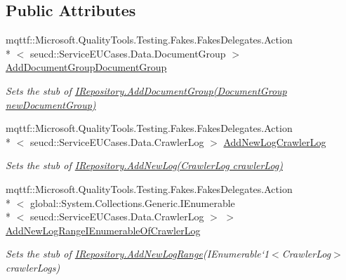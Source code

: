 \subsection*{Public Attributes}
\begin{DoxyCompactItemize}
\item 
mqttf\-::\-Microsoft.\-Quality\-Tools.\-Testing.\-Fakes.\-Fakes\-Delegates.\-Action\\*
$<$ seucd\-::\-Service\-E\-U\-Cases.\-Data.\-Document\-Group $>$ \hyperlink{class_service_e_u_cases_1_1_repositories_1_1_fakes_1_1_stub_i_repository_a313470a687354d7a46077691cb61c662}{Add\-Document\-Group\-Document\-Group}
\begin{DoxyCompactList}\small\item\em Sets the stub of \hyperlink{interface_service_e_u_cases_1_1_repositories_1_1_i_repository_a1dc7e14bffc195cc3fc51df35128064c}{I\-Repository.\-Add\-Document\-Group(\-Document\-Group new\-Document\-Group)}\end{DoxyCompactList}\item 
mqttf\-::\-Microsoft.\-Quality\-Tools.\-Testing.\-Fakes.\-Fakes\-Delegates.\-Action\\*
$<$ seucd\-::\-Service\-E\-U\-Cases.\-Data.\-Crawler\-Log $>$ \hyperlink{class_service_e_u_cases_1_1_repositories_1_1_fakes_1_1_stub_i_repository_a8224a399eea01e43904e7c62c6a4044a}{Add\-New\-Log\-Crawler\-Log}
\begin{DoxyCompactList}\small\item\em Sets the stub of \hyperlink{interface_service_e_u_cases_1_1_repositories_1_1_i_repository_af8b3072d0263cf8cd3e6175577938fa3}{I\-Repository.\-Add\-New\-Log(\-Crawler\-Log crawler\-Log)}\end{DoxyCompactList}\item 
mqttf\-::\-Microsoft.\-Quality\-Tools.\-Testing.\-Fakes.\-Fakes\-Delegates.\-Action\\*
$<$ global\-::\-System.\-Collections.\-Generic.\-I\-Enumerable\\*
$<$ seucd\-::\-Service\-E\-U\-Cases.\-Data.\-Crawler\-Log $>$ $>$ \hyperlink{class_service_e_u_cases_1_1_repositories_1_1_fakes_1_1_stub_i_repository_ad1353a1205f37f0aa6a6844ffd373580}{Add\-New\-Log\-Range\-I\-Enumerable\-Of\-Crawler\-Log}
\begin{DoxyCompactList}\small\item\em Sets the stub of \hyperlink{interface_service_e_u_cases_1_1_repositories_1_1_i_repository_ae8af796db94815cb1e3639e73f0b8732}{I\-Repository.\-Add\-New\-Log\-Range}(I\-Enumerable`1$<$Crawler\-Log$>$ crawler\-Logs)\end{DoxyCompactList}\item 

\end{DoxyCompactItemize}

